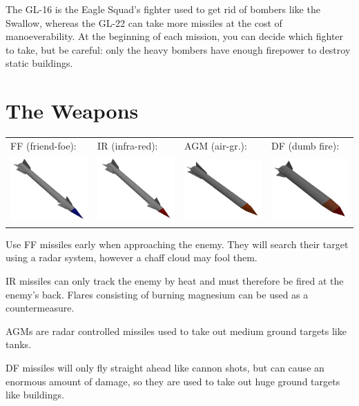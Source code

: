 The GL-16 is the Eagle Squad's fighter used to get rid of bombers like the Swallow,
whereas the GL-22 can take more missiles at the cost of manoeverability.
At the beginning of each mission, you can decide which fighter to take, but be careful:
only the heavy bombers have enough firepower to destroy static buildings.


\section{The Weapons}
\label{sec:weapons}

\begin{center}
\begin{tabular}{p{3cm}p{3cm}p{3cm}p{3cm}}
FF (friend-foe): &
IR (infra-red): &
AGM (air-gr.): &
DF (dumb fire):\\
\includegraphics[width=3cm]{missile_ff.jpg} &
\includegraphics[width=3cm]{missile_ir.jpg} &
\includegraphics[width=3cm]{missile_agm.jpg} &
\includegraphics[width=3cm]{missile_df.jpg}\\
\end{tabular}
\end{center}

Use FF missiles early when approaching the enemy.
They will search their target using a radar system,
however a chaff cloud may fool them.

IR missiles can only track the enemy by heat and must
therefore be fired at the enemy's back.
Flares consisting of burning magnesium can be used as a countermeasure.

AGMs are radar controlled missiles used to
take out medium ground targets like tanks.

DF missiles will only fly straight ahead like cannon shots,
but can cause an enormous amount of damage,
so they are used to take out huge ground targets like buildings.
